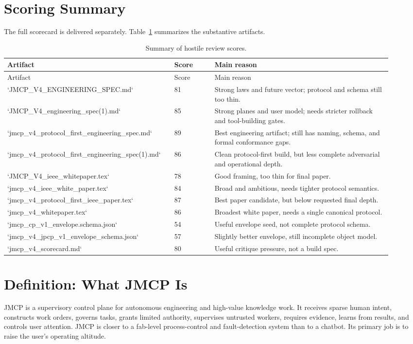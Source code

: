 \documentclass[12pt,journal,onecolumn,draftclsnofoot]{IEEEtran}
\begin{document}
\section{Scoring Summary}
The full scorecard is delivered separately. Table~\ref{tab:score-summary} summarizes the substantive artifacts.

\begin{longtable}{p{0.38\linewidth}p{0.10\linewidth}p{0.44\linewidth}}
\caption{Summary of hostile review scores.}\label{tab:score-summary}\\
\toprule
Artifact & Score & Main reason \\
\midrule
\endfirsthead
\toprule
Artifact & Score & Main reason \\
\midrule
\endhead
`JMCP\_V4\_ENGINEERING\_SPEC.md` & 81 & Strong laws and future vector; protocol and schema still too thin. \\
`JMCP\_V4\_engineering\_spec(1).md` & 85 & Strong planes and user model; needs stricter rollback and tool-building gates. \\
`jmcp\_v4\_protocol\_first\_engineering\_spec.md` & 89 & Best engineering artifact; still has naming, schema, and formal conformance gaps. \\
`jmcp\_v4\_protocol\_first\_engineering\_spec(1).md` & 86 & Clean protocol-first build, but less complete adversarial and operational depth. \\
`JMCP\_V4\_ieee\_whitepaper.tex` & 78 & Good framing, too thin for final paper. \\
`jmcp\_v4\_ieee\_white\_paper.tex` & 84 & Broad and ambitious, needs tighter protocol semantics. \\
`jmcp\_v4\_protocol\_first\_ieee\_paper.tex` & 87 & Best paper candidate, but below requested final depth. \\
`jmcp\_v4\_whitepaper.tex` & 86 & Broadest white paper, needs a single canonical protocol. \\
`jmcp\_cp\_v1\_envelope.schema.json` & 54 & Useful envelope seed, not complete protocol schema. \\
`jmcp\_v4\_jpcp\_v1\_envelope\_schema.json` & 57 & Slightly better envelope, still incomplete object model. \\
`jmcp\_v4\_scorecard.md` & 80 & Useful critique pressure, not a build spec. \\
\bottomrule
\end{longtable}

\section{Definition: What JMCP Is}
JMCP is a supervisory control plane for autonomous engineering and high-value knowledge work. It receives sparse human intent, constructs work orders, governs tasks, grants limited authority, supervises untrusted workers, requires evidence, learns from results, and controls user attention. JMCP is closer to a fab-level process-control and fault-detection system than to a chatbot. Its primary job is to raise the user's operating altitude.
\end{document}
